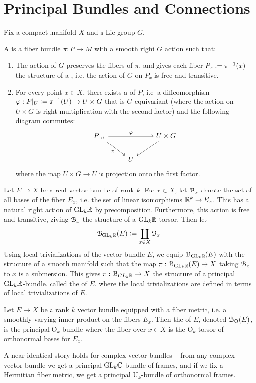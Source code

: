 %
\section{Principal Bundles and Connections}
%
Fix a compact manifold $X$ and a Lie group $G$.
%
\begin{defn}
A  is a fiber bundle $\pi : P \to M$ with a smooth
right $G$ action such that:
\begin{enumerate}
  \item The action of $G$ preserves the fibers of $\pi$, and gives each fiber
  $P_x \vcentcolon= \pi^{-1}(x)$ the structure of a , i.e. the
  action of $G$ on $P_x$ is free and transitive.
  \item For every point $x \in X$, there exists a  of
  $P$, i.e. a diffeomorphism $\varphi : P\vert_U \vcentcolon= \pi^{-1}(U) \to U \times G$
  that is $G$-equivariant (where the action on $U \times G$ is right multiplication
  with the second factor) and the following diagram commutes:
  \[\begin{tikzcd}
  P\vert_U \ar[rr, "\varphi"] \ar[dr, "\pi"'] && U \times G \ar[dl] \\
  & U
  \end{tikzcd}\]
  where the map $U\times G \to U$ is projection onto the first factor.
\end{enumerate}
\end{defn}
%
\begin{exmp}
Let $E \to X$ be a real vector bundle of rank $k$. For $x \in X$, let $\mathcal{B}_x$
denote the set of all bases of the fiber $E_x$, i.e. the set of linear isomorphisms
$\mathbb{R}^k \to E_x$. This has a natural right action of $\mathrm{GL}_k\mathbb{R}$ by precomposition.
Furthermore, this action is free and transitive, giving $\mathcal{B}_x$ the structure
of a $\mathrm{GL}_k\mathbb{R}$-torsor. Then let
\[
\mathcal{B}_{\mathrm{GL}_k\mathbb{R}}(E) \vcentcolon= \coprod_{x \in X}\mathcal{B}_x
\]
Using local trivializations of the vector bundle $E$, we equip $\mathcal{B}_{\mathrm{GL}_k\mathbb{R}}(E)$
with the structure of a smooth manifold such that the map
$\pi : \mathcal{B}_{\mathrm{GL}_k\mathbb{R}}(E) \to X$ taking $\mathcal{B}_x$ to $x$ is a submersion. This gives
$\pi : \mathcal{B}_{GL_k\mathbb{R}} \to X$ the structure of a principal $\mathrm{GL}_k\mathbb{R}$-bundle, called
the  of $E$,  where the local trivializations are defined in terms of
local trivializations of $E$.
\end{exmp}
%
\begin{exmp}
Let $E \to X$ be a rank $k$ vector bundle equipped with a fiber metric, i.e. a
smoothly  varying inner product on the fibers $E_x$. Then the
 of $E$, denoted $\mathcal{B}_{\mathrm{O}}(E)$, is the principal
$\mathrm{O}_k$-bundle where the fiber over $x \in X$ is the $\mathrm{O}_k$-torsor
of orthonormal bases for $E_x$.
\end{exmp}
%
A near identical story holds for complex vector bundles -- from any complex
vector bundle we get a principal $\mathrm{GL}_k\mathbb{C}$-bundle of frames, and if
we fix a Hermitian fiber metric, we get a principal $\mathrm{U}_k$-bundle of
orthonormal frames. \\


